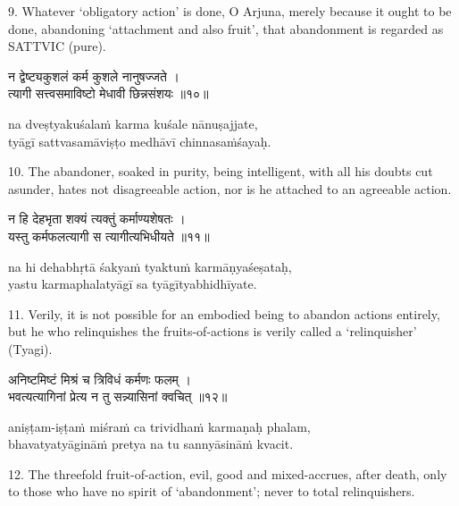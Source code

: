 9. Whatever `obligatory action' is done, O Arjuna, merely because it ought to
be done, abandoning `attachment and also fruit', that abandonment is regarded
as SATTVIC (pure).

\begin{gitaverse}
न द्वेष्ट्यकुशलं कर्म कुशले नानुषज्जते । \\
त्यागी सत्त्वसमाविष्टो मेधावी छिन्नसंशयः ॥१०॥
\end{gitaverse}

\begin{transliteration}
na dveṣtyakuśalaṁ karma kuśale nānuṣajjate, \\
tyāgī sattvasamāviṣṭo medhāvī chinnasaṁśayaḥ.
\end{transliteration}

10. The abandoner, soaked in purity, being intelligent, with all his doubts cut
asunder, hates not disagreeable action, nor is he attached to an agreeable
action.

\begin{gitaverse}
न हि देहभृता शक्यं त्यक्तुं कर्माण्यशेषतः । \\
यस्तु कर्मफलत्यागी स त्यागीत्यभिधीयते ॥११॥
\end{gitaverse}

\begin{transliteration}
na hi dehabhṛtā śakyaṁ tyaktuṁ karmāṇyaśeṣataḥ, \\
yastu karmaphalatyāgī sa tyāgītyabhidhīyate.
\end{transliteration}

11. Verily, it is not possible for an embodied being to abandon actions
entirely, but he who relinquishes the fruits-of-actions is verily called a
`relinquisher' (Tyagi).

\begin{gitaverse}
अनिष्टमिष्टं मिश्रं च त्रिविधं कर्मणः फलम् । \\
भवत्यत्यागिनां प्रेत्य न तु सन्न्यासिनां क्वचित् ॥१२॥
\end{gitaverse}

\begin{transliteration}
aniṣṭam-iṣṭaṁ miśraṁ ca trividhaṁ karmaṇaḥ phalam, \\
bhavatyatyāgināṁ pretya na tu sannyāsināṁ kvacit.
\end{transliteration}

12. The threefold fruit-of-action, evil, good and mixed-accrues, after death,
only to those who have no spirit of `abandonment'; never to total
relinquishers.

